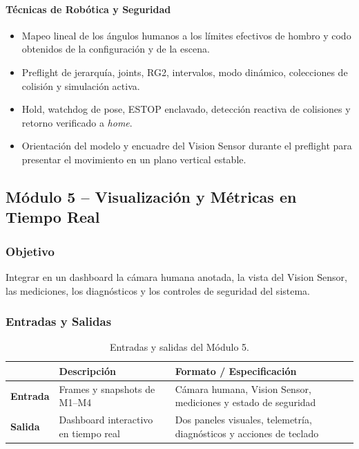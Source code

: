 \paragraph{Técnicas de Robótica y Seguridad}
\begin{itemize}[leftmargin=1.5em]
  \item Mapeo lineal de los ángulos humanos a los límites efectivos de hombro
        y codo obtenidos de la configuración y de la escena.
  \item Preflight de jerarquía, joints, RG2, intervalos, modo dinámico,
        colecciones de colisión y simulación activa.
  \item Hold, watchdog de pose, ESTOP enclavado, detección reactiva de
        colisiones y retorno verificado a \textit{home}.
  \item Orientación del modelo y encuadre del Vision Sensor durante el
        preflight para presentar el movimiento en un plano vertical estable.
\end{itemize}

\subsection{Módulo 5 -- Visualización y Métricas en Tiempo Real}

\subsubsection*{Objetivo}
Integrar en un dashboard la cámara humana anotada, la vista del Vision Sensor,
las mediciones, los diagnósticos y los controles de seguridad del sistema.

\subsubsection*{Entradas y Salidas}

\begin{table}[h!]
\centering
\renewcommand{\arraystretch}{1.3}
\begin{tabularx}{\textwidth}{
    >{\bfseries}p{3cm}
    X
    X
}    
\toprule
&
\textbf{Descripción} &
\textbf{Formato / Especificación} \\
\midrule
Entrada &
  Frames y snapshots de M1--M4 &
  Cámara humana, Vision Sensor, mediciones y estado de seguridad \\
\midrule
Salida &
  Dashboard interactivo en tiempo real &
  Dos paneles visuales, telemetría, diagnósticos y acciones de teclado \\
\bottomrule
\end{tabularx}
\caption{Entradas y salidas del Módulo 5.}
\label{tab:m5_io}
\end{table}
 
